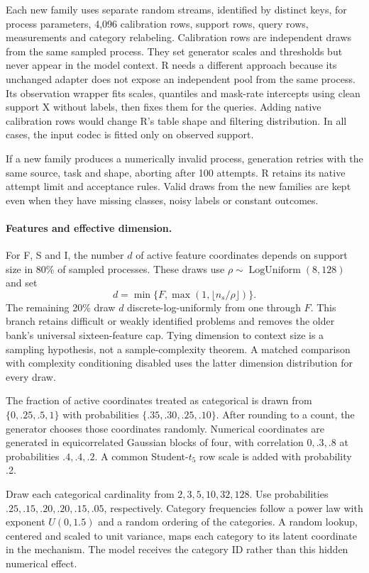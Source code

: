 \documentclass[11pt]{article}
\begin{document}
Each new family uses separate random streams, identified by distinct keys, for process parameters, 4,096 calibration rows, support rows, query rows, measurements and category relabeling. Calibration rows are independent draws from the same sampled process. They set generator scales and thresholds but never appear in the model context. R needs a different approach because its unchanged adapter does not expose an independent pool from the same process. Its observation wrapper fits scales, quantiles and mask-rate intercepts using clean support X without labels, then fixes them for the queries. Adding native calibration rows would change R's table shape and filtering distribution. In all cases, the input codec is fitted only on observed support.

If a new family produces a numerically invalid process, generation retries with the same source, task and shape, aborting after 100 attempts. R retains its native attempt limit and acceptance rules. Valid draws from the new families are kept even when they have missing classes, noisy labels or constant outcomes.

\paragraph{Features and effective dimension.}
For F, S and I, the number $d$ of active feature coordinates depends on support size in 80\% of sampled processes. These draws use $\rho\sim\operatorname{LogUniform}(8,128)$ and set
\[
 d=\min\{F,\max(1,\lfloor n_s/\rho\rfloor)\}.
\]
The remaining 20\% draw $d$ discrete-log-uniformly from one through $F$. This branch retains difficult or weakly identified problems and removes the older bank's universal sixteen-feature cap. Tying dimension to context size is a sampling hypothesis, not a sample-complexity theorem. A matched comparison with complexity conditioning disabled uses the latter dimension distribution for every draw.

The fraction of active coordinates treated as categorical is drawn from $\{0,.25,.5,1\}$ with probabilities $\{.35,.30,.25,.10\}$. After rounding to a count, the generator chooses those coordinates randomly. Numerical coordinates are generated in equicorrelated Gaussian blocks of four, with correlation $0,.3,.8$ at probabilities $.4,.4,.2$. A common Student-$t_5$ row scale is added with probability .2.

Draw each categorical cardinality from $2,3,5,10,32,128$. Use probabilities $.25,.15,.20,.20,.15,.05$, respectively. Category frequencies follow a power law with exponent $U(0,1.5)$ and a random ordering of the categories. A random lookup, centered and scaled to unit variance, maps each category to its latent coordinate in the mechanism. The model receives the category ID rather than this hidden numerical effect.
\end{document}
